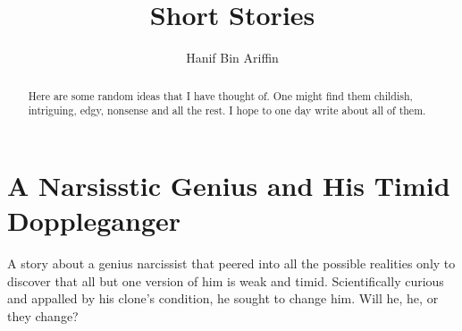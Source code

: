 \documentclass[a4paper,10pt]{article}
\title{Short Stories}
\author{Hanif Bin Ariffin}
\begin{document}
\maketitle

\begin{abstract}

Here are some random ideas that I have thought of.
One might find them childish, intriguing, edgy, nonsense and all the rest.
I hope to one day write about all of them.

\end{abstract}

\tableofcontents

\section{A Narsisstic Genius and His Timid Doppleganger}

A story about a genius narcissist that peered into all the possible realities only to discover that all but one version of him is weak and timid.
Scientifically curious and appalled by his clone's condition, he sought to change him.
Will he, he, or they change?
\end{document}
